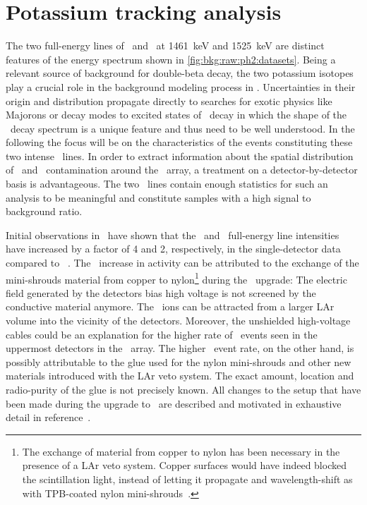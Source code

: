 \begin{table}
\centering
  \caption{%
    Fit results of the \a\ events background analysis for the
    \enrBEGeII\ and \enrCoaxII\ data sets. Values are given in counts in the
    full \pdf\ range from 40~keV to 8000~keV.
  }\label{tab:bkg:raw:ph2:amodel:results}
  
\end{table}

\section{Potassium tracking analysis}%
\label{sec:bkg:raw:ph2:kmodel}

The two full-energy lines of \kvn\ and \kvz\ at 1461~keV and 1525~keV are distinct
features of the energy spectrum shown in \cref{fig:bkg:raw:ph2:datasets}. Being a relevant
source of background for double-beta decay, the two potassium isotopes play a crucial role
in the background modeling process in \gerda. Uncertainties in their origin and
distribution propagate directly to searches for exotic physics like Majorons or decay
modes to excited states of \nnbb\ decay in which the shape of the \nnbb\ decay spectrum is
a unique feature and thus need to be well understood. In the following the focus will be
on the characteristics of the events constituting these two intense \g\ lines. In order to
extract information about the spatial distribution of \kvn\ and \kvz\ contamination around
the \gerda\ array, a treatment on a detector-by-detector basis is advantageous. The two
\g\ lines contain enough statistics for such an analysis to be meaningful and constitute
samples with a high signal to background ratio.

Initial observations in \phasetwo\ have shown that the \kvn\ and \kvz\ full-energy line
intensities have increased by a factor of 4 and 2, respectively, in the single-detector
data compared to \phaseone~\cite{DAndrea2017}. The \kvz\ increase in activity can be
attributed to the exchange of the mini-shrouds material from copper to nylon\footnote{%
  The exchange of material from copper to nylon has been necessary in the presence of a
  LAr veto system. Copper surfaces would have indeed blocked the scintillation light,
  instead of letting it propagate and wavelength-shift as with TPB-coated nylon
  mini-shrouds~\cite{Lubashevskiy2017}.
} during the \phasetwo\ upgrade: The electric field generated by the detectors bias high
voltage is not screened by the conductive material anymore. The \kvz\ ions can be
attracted from a larger LAr volume into the vicinity of the detectors.  Moreover, the
unshielded high-voltage cables could be an explanation for the higher rate of \kvz\ events
seen in the uppermost detectors in the \gerda\ array. The higher \kvn\ event rate, on the
other hand, is possibly attributable to the glue used for the nylon mini-shrouds and other
new materials introduced with the LAr veto system. The exact amount, location and
radio-purity of the glue is not precisely known.  All changes to the setup that have been
made during the upgrade to \phasetwo\ are described and motivated in exhaustive detail in
reference~\cite{Agostini2018a}.

